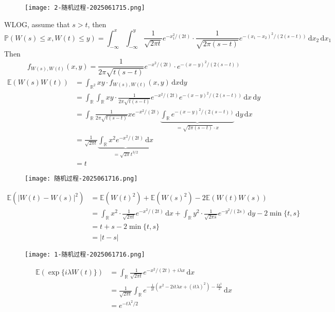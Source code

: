 \begin{figure}[H]
\centering
\texttt{[image: 2-随机过程-2025061715.png]}
\label{}
\end{figure}

WLOG, assume that $s>t$, then
\[
\mathbb{P}(W(s)\leq x,W(t)\leq y)=\int_{-\infty}^{x} \int_{-\infty}^{y} \frac{1}{\sqrt{ 2\pi t}}e^{ -x_1^{2}/(2t) }\cdot\frac{1}{\sqrt{ 2\pi(s-t) }}e^{ -(x_1-x_2)^{2}/(2(s-t)) } \, \mathrm{d}x_2  \, \mathrm{d}x_1 
\]
Then
\[
f_{W(s),W(t)}(x,y)=\frac{1}{2\pi \sqrt{ t(s-t) }}e^{ -x^{2}/(2t) }\cdot e^{ -(x-y)^{2}/(2(s-t)) }
\]
\[
\begin{aligned}
\mathbb{E}(W(s)W(t)) & =\int_{\mathbb{R}^{2}}^{} xy\cdot f_{W(s),W(t)}(x,y) \, \mathrm{d}x\mathrm{d}y  \\
 & =\int_{\mathbb{R}}^{} \int_{\mathbb{R}}^{} xy\cdot\frac{1}{2\pi \sqrt{ t(s-t) }}e^{ -x^{2}/(2t) }e^{ -(x-y)^{2}/(2(s-t)) } \, \mathrm{d}x  \, \mathrm{d}y \\
  & =\int_{\mathbb{R}}^{} \frac{1}{2\pi \sqrt{ t(s-t) }}xe^{ -x^{2}/(2t) }\underbrace{ \int_{\mathbb{R}}^{} e^{ -(x-y)^{2}/(2(s-t)) }  }_{ =\sqrt{ 2\pi(s-t) }\cdot x  }\, \mathrm{d}y \, \mathrm{d}x  \\
 & = \frac{1}{\sqrt{ 2\pi t }}\underbrace{ \int_{\mathbb{R}}^{} x^{2}e^{ -x^{2}/(2t) } \, \mathrm{d}x  }_{ =\sqrt{ 2\pi }t^{3/2 }  } \\
 & =t
\end{aligned}
\]
\begin{figure}[H]
\centering
\texttt{[image: 随机过程-2025061716.png]}
\label{}
\end{figure}
\[
\begin{aligned}
\mathbb{E}(\lvert W(t)-W(s) \rvert ^{2}) & =\mathbb{E}(W(t)^{2})+\mathbb{E}(W(s)^{2})-2\mathbb{E}(W(t)W(s)) \\
 & =\int_{\mathbb{R}}^{} x^{2}\cdot\frac{1}{\sqrt{ 2\pi t }}e^{ -x^{2}/(2t) } \, \mathrm{d}x +\int_{\mathbb{R}}^{} y^{2}\cdot\frac{1}{\sqrt{ 2\pi s }}e^{ -y^{2}/(2s) } \, \mathrm{d}y-2\min\{ t,s  \}  \\
 & = t+s-2\min\{ t,s \} \\
 & =\lvert t-s \rvert 
\end{aligned}
\]
\begin{figure}[H]
\centering
\texttt{[image: 1-随机过程-2025061716.png]}
\label{}
\end{figure}
\[
\begin{aligned}
\mathbb{E}(\exp \{ i\lambda W(t) \}) & =\int_{\mathbb{R}}^{} \frac{1}{\sqrt{ 2\pi t}}e^{ -x^{2}/(2t)+i\lambda x } \, \mathrm{d}x  \\
 & =\frac{1}{\sqrt{ 2\pi t }}\int_{\mathbb{R}}^{} e^{ -\frac{1}{2t}(x^{2}-2it\lambda x+(it\lambda)^{2})-\frac{t\lambda^{2}}{2} } \, \mathrm{d}x  \\
 & =e^{ -t\lambda^{2}/2  } 
\end{aligned}
\]
